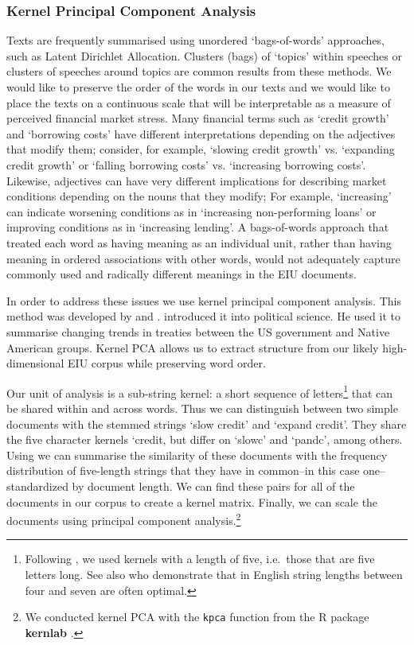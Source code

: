 \documentclass[]{article}
\begin{document}
\subsubsection{Kernel Principal Component
Analysis}\label{kernel-principal-component-analysis}

Texts are frequently summarised using unordered `bags-of-words'
approaches, such as Latent Dirichlet Allocation. Clusters (bags) of `topics' within speeches or clusters of speeches around topics \citep[for a review see][]{Grimmer2013} are common results from these methods. We would like to preserve the order of the words in our texts and we would like to place the texts on a continuous scale that will be interpretable as a measure of perceived financial market stress. Many financial terms such as `credit growth' and `borrowing costs' have different interpretations depending on the adjectives that modify them; consider, for example, `slowing credit growth' vs. `expanding credit growth' or `falling borrowing costs' vs. `increasing borrowing costs'. Likewise, adjectives can have very different implications for describing market conditions depending on the nouns that they modify;  For example, `increasing' can indicate worsening conditions as in `increasing non-performing loans' or improving conditions as in `increasing lending'.  A
bags-of-words approach that treated each word as having meaning as an individual unit, rather than having meaning in ordered associations with other words, would not adequately capture commonly used and radically different meanings in the EIU documents.

In order to address these issues we use kernel principal component analysis. This method was developed by \cite{Scholkopf1998} and \cite{lodhi2002}. \cite{Spirling2012} introduced it into political science. He used it to summarise changing trends in treaties between the US government and Native American groups. Kernel PCA allows us to extract structure from our likely high-dimensional EIU corpus \cite[6531--6537]{Zhang2010} while preserving word order.

Our unit of analysis is a sub-string kernel: a short sequence of letters\footnote{Following \cite{Spirling2012}, we used kernels with a length of five, i.e.~those that are five letters long. See also \cite{lodhi2002} who demonstrate that in English string lengths between four and seven are often optimal.} that can be shared within and across words. Thus we can distinguish between two simple documents with the stemmed strings `slow credit' and `expand credit'. They share the five character kernels `credit, but differ on `slowc' and `pandc', among others. Using \cite{lodhi2002} we can summarise the similarity of these documents with the frequency distribution of five-length strings that they have in common--in this case one--standardized by document length. We can find these pairs for all of the documents in our corpus to create a kernel matrix. Finally, we can scale the documents using principal component analysis.\footnote{We conducted kernel PCA with the \texttt{kpca} function from the R package \textbf{kernlab} \citep{kerblabCite}.}
\end{document}
